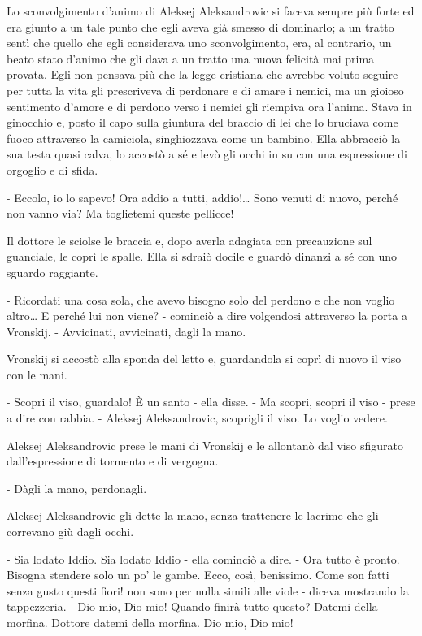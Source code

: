 Lo sconvolgimento d'animo di Aleksej Aleksandrovic si faceva sempre più forte ed era giunto a un tale punto che egli aveva già smesso di dominarlo; a un tratto sentì che quello che egli considerava uno sconvolgimento, era, al contrario, un beato stato d'animo che gli dava a un tratto una nuova felicità mai prima provata. Egli non pensava più che la legge cristiana che avrebbe voluto seguire per tutta la vita gli prescriveva di perdonare e di amare i nemici, ma un gioioso sentimento d'amore e di perdono verso i nemici gli riempiva ora l'anima. Stava in ginocchio e, posto il capo sulla giuntura del braccio di lei che lo bruciava come fuoco attraverso la camiciola, singhiozzava come un bambino. Ella abbracciò la sua testa quasi calva, lo accostò a sé e levò gli occhi in su con una espressione di orgoglio e di sfida. 

- Eccolo, io lo sapevo! Ora addio a tutti, addio!\ldots{} Sono venuti di nuovo, perché non vanno via? Ma toglietemi queste pellicce! 

Il dottore le sciolse le braccia e, dopo averla adagiata con precauzione sul guanciale, le coprì le spalle. Ella si sdraiò docile e guardò dinanzi a sé con uno sguardo raggiante. 

- Ricordati una cosa sola, che avevo bisogno solo del perdono e che non voglio altro\ldots{} E perché lui non viene? - cominciò a dire volgendosi attraverso la porta a Vronskij. - Avvicinati, avvicinati, dagli la mano. 

Vronskij si accostò alla sponda del letto e, guardandola si coprì di nuovo il viso con le mani. 

- Scopri il viso, guardalo! È un santo - ella disse. - Ma scopri, scopri il viso - prese a dire con rabbia. - Aleksej Aleksandrovic, scoprigli il viso. Lo voglio vedere. 

Aleksej Aleksandrovic prese le mani di Vronskij e le allontanò dal viso sfigurato dall'espressione di tormento e di vergogna. 

- Dàgli la mano, perdonagli. 

Aleksej Aleksandrovic gli dette la mano, senza trattenere le lacrime che gli correvano giù dagli occhi. 

- Sia lodato Iddio. Sia lodato Iddio - ella cominciò a dire. - Ora tutto è pronto. Bisogna stendere solo un po' le gambe. Ecco, così, benissimo. Come son fatti senza gusto questi fiori! non sono per nulla simili alle viole - diceva mostrando la tappezzeria. - Dio mio, Dio mio! Quando finirà tutto questo? Datemi della morfina. Dottore datemi della morfina. Dio mio, Dio mio! 


